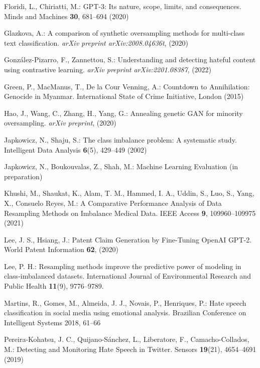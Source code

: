 \documentclass[runningheads]{llncs}
\begin{document}
\begin{thebibliography}{27}
Floridi, L., Chiriatti, M.: GPT-3: Its nature, scope, limits, and consequences. Minds and Machines \textbf{30}, 681--694 (2020)

Glazkova, A.: A comparison of synthetic oversampling methods for multi-class text classification. \emph{arXiv preprint arXiv:2008.04636t}, (2020)

González-Pizarro, F., Zannettou, S.: Understanding and detecting hateful content using contrastive learning. \emph{arXiv preprint arXiv:2201.08387}, (2022)

Green, P., MacManus, T., De la Cour Venning, A.: Countdown to Annihilation: Genocide in Myanmar. International State of Crime Initiative, London (2015)

Hao, J., Wang, C., Zhang, H., Yang, G.: Annealing genetic GAN for minority oversampling. \emph{arXiv preprint}, (2020)

Japkowicz, N., Shaju, S.: The class imbalance problem: A systematic study. Intelligent Data Analysis \textbf{6}(5), 429--449 (2002)

Japkowicz, N., Boukouvalas, Z., Shah, M.: Machine Learning Evaluation (in preparation)

Khushi, M., Shaukat, K., Alam, T. M., Hammed, I. A., Uddin, S., Luo, S., Yang, X., Consuelo Reyes, M.: A Comparative Performance Analysis of Data Resampling Methods on Imbalance Medical Data. IEEE Access \textbf{9}, 109960--109975 (2021)

Lee, J. S., Hsiang, J.: Patent Claim Generation by Fine-Tuning OpenAI GPT-2. World Patent Information \textbf{62}, (2020)

Lee, P. H.: Resampling methods improve the predictive power of modeling in class-imbalanced datasets. International Journal of Environmental Research and Public Health \textbf{11}(9), 9776--9789.

Martins, R., Gomes, M., Almeida, J. J., Novais, P., Henriques, P.: Hate speech classification in social media using emotional analysis. Brazilian Conference on Intelligent Systems 2018, 61--66

Pereira-Kohatsu, J. C., Quijano-Sánchez, L., Liberatore, F., Camacho-Collados, M.: Detecting and Monitoring Hate Speech in Twitter. Sensors \textbf{19}(21), 4654--4691 (2019)


\end{thebibliography}
\end{document}

